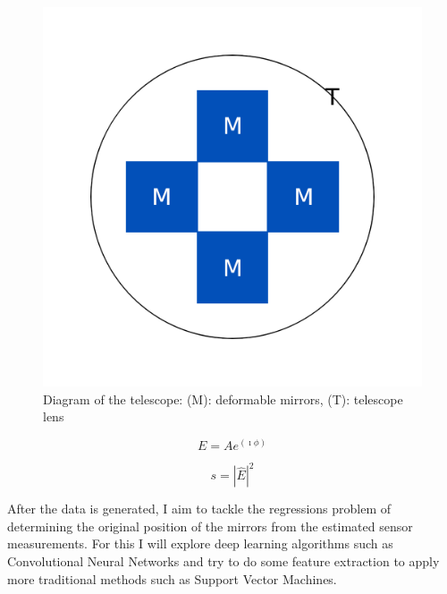 \documentclass{article}
\begin{document}
\begin{figure}[htbp]
    \centering
    
    \includegraphics{telescope_diagram.png}
    \caption{Diagram of the telescope: (M): deformable mirrors, (T): telescope
    lens}
    \label{diagram}
\end{figure}

\begin{equation}\label{electric-field}
    E =  Ae^{(\imath \phi)}
\end{equation}

\begin{equation}\label{sensor}
    s = |\hat{ E }|^2
\end{equation}

After the data is generated, I aim to tackle the regressions problem of
determining the original position of the mirrors from the estimated sensor
measurements. For this I will explore deep learning algorithms such as
Convolutional Neural Networks and try to do some feature extraction to
apply more traditional methods such as Support Vector Machines.
\end{document}
